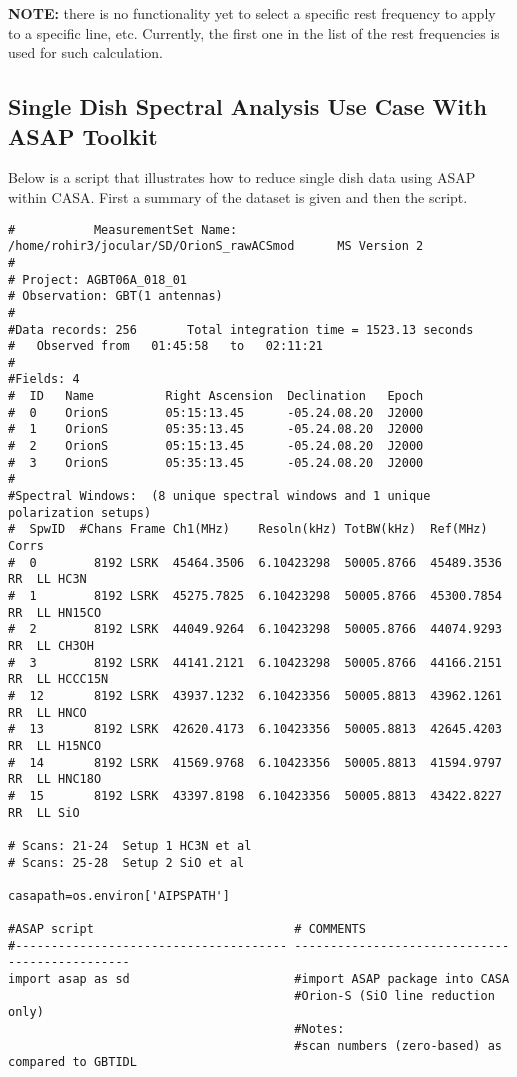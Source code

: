 {\bf NOTE:} there is no functionality yet to select a specific rest frequency 
to apply to a specific line, etc. Currently, the first one in the list
of the rest frequencies is used for such calculation.

 
\subsection{Single Dish Spectral Analysis Use Case With ASAP Toolkit}
\label{subsection:sd.asap.usecase}

Below is a script that illustrates how to reduce single dish data
using ASAP within CASA.  First a summary of the dataset is given and
then the script.

\small
\begin{verbatim}
#           MeasurementSet Name:  /home/rohir3/jocular/SD/OrionS_rawACSmod      MS Version 2
#
# Project: AGBT06A_018_01
# Observation: GBT(1 antennas)
#
#Data records: 256       Total integration time = 1523.13 seconds
#   Observed from   01:45:58   to   02:11:21
#
#Fields: 4
#  ID   Name          Right Ascension  Declination   Epoch
#  0    OrionS        05:15:13.45      -05.24.08.20  J2000
#  1    OrionS        05:35:13.45      -05.24.08.20  J2000
#  2    OrionS        05:15:13.45      -05.24.08.20  J2000
#  3    OrionS        05:35:13.45      -05.24.08.20  J2000
#
#Spectral Windows:  (8 unique spectral windows and 1 unique polarization setups)
#  SpwID  #Chans Frame Ch1(MHz)    Resoln(kHz) TotBW(kHz)  Ref(MHz)    Corrs
#  0        8192 LSRK  45464.3506  6.10423298  50005.8766  45489.3536  RR  LL HC3N
#  1        8192 LSRK  45275.7825  6.10423298  50005.8766  45300.7854  RR  LL HN15CO
#  2        8192 LSRK  44049.9264  6.10423298  50005.8766  44074.9293  RR  LL CH3OH
#  3        8192 LSRK  44141.2121  6.10423298  50005.8766  44166.2151  RR  LL HCCC15N
#  12       8192 LSRK  43937.1232  6.10423356  50005.8813  43962.1261  RR  LL HNCO
#  13       8192 LSRK  42620.4173  6.10423356  50005.8813  42645.4203  RR  LL H15NCO
#  14       8192 LSRK  41569.9768  6.10423356  50005.8813  41594.9797  RR  LL HNC18O
#  15       8192 LSRK  43397.8198  6.10423356  50005.8813  43422.8227  RR  LL SiO

# Scans: 21-24  Setup 1 HC3N et al
# Scans: 25-28  Setup 2 SiO et al

casapath=os.environ['AIPSPATH']

#ASAP script                            # COMMENTS                                      
#-------------------------------------- ----------------------------------------------- 
import asap as sd                       #import ASAP package into CASA                  
                                        #Orion-S (SiO line reduction only)
                                        #Notes:
                                        #scan numbers (zero-based) as compared to GBTIDL


\end{verbatim}
